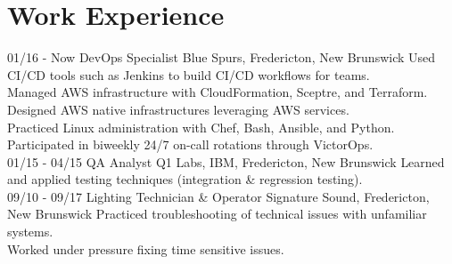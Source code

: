 \documentclass[a4paper]{resume}
\begin{document}
\section{Work Experience}
\begin{entrylist}
  \entry
    {01/16 - Now}
    {DevOps Specialist}
    {Blue Spurs, Fredericton, New Brunswick}
    {Used CI/CD tools such as Jenkins to build CI/CD workflows for teams.\\
    Managed AWS infrastructure with CloudFormation, Sceptre, and Terraform.\\
    Designed AWS native infrastructures leveraging AWS services.\\
    Practiced Linux administration with Chef, Bash, Ansible, and Python.\\
    Participated in biweekly 24/7 on-call rotations through VictorOps.\\}
  \entry
    {01/15 - 04/15}
    {QA Analyst}
    {Q1 Labs, IBM, Fredericton, New Brunswick}
    {Learned and applied testing techniques (integration \& regression testing).\\}
  \entry
    {09/10 - 09/17}
    {Lighting Technician \& Operator}
    {Signature Sound, Fredericton, New Brunswick}
    {Practiced troubleshooting of technical issues with unfamiliar systems.\\
    Worked under pressure fixing time sensitive issues.}
\end{entrylist}
\end{document}
